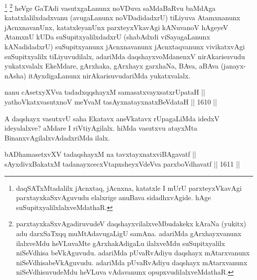 \begin{artha}
\footnote{daqSATxMtadalilx jAcnxtaq, jAcnxna, katatxle I mUrU parxteyxVkavAgi parxtayxkaSxvAguvudu elalxrige anuBava sidadhxvAgide. hAge suSupitxyalilxlalxveMdathaR.}
\footnote{parxtayxkaSxvAgadiruvudeV daqshayxvilalxveMbudakekx kAraNa (yukitx) adu darxSaTxqq muMtAdavugaLigU samAna. adariMda gArxhayxvanunx ilalxveMdu heVLuvaMte gArxhakAdigaLu ilalxveMdu suSupitxyalilx niSeVdhisa beVkAguvudu. adariMda pUvaRvAdiyu daqshayx mAtarxvanunx niSeVdhisabeVkAguvudu. adariMda pUvaRvAdiyu daqshayx mAtarxvanunx niSeVdhisuvudeMdu heVLuva vAdavanunx opupxvudilalxveMdathaR.}
heVge GaTAdi vasutxgaLanunx noVDuva saMdaBaRvu baMdAga katatxlalilxdadxvanu (avugaLanunx noVDadidadxrU) tiLiyuva Atamxnanunx jAcnxnavanUnx, katatxleyanUnx parxteyxVkavAgi kANuvanoV hAgeyeV AtamxnU kUDa suSupitxyalilxdadxrU (shabAdxdi viSayagaLanunx kANadidadxrU) suSupitxyanunx jAcnxnavanunx jAcnxtaqvanunx vivikatxvAgi suSupitxyalilx tiLiyuvudilalx, adariMda daqshayxvoMdanenxV nirAkarisuvudu yukatxvalalx EkeMdare, gArxhaka, gArxhayx garxhaNa, BAva, aBAva (janayx-nAsha) itAyxdigaLanunx nirAkarisuvudariMda yukatxvalalx.
\end{artha}


\begin{shl}
nanu cAsetxyXVva tadadxqqshayxM samasatxvayxsatxrUpataH || \\
yathoVkatxvasutxnoV meYvaM tasAyxnatayxnatxBeVdataH \hfill || 1610 ||  
\end{shl}

\begin{artha}
A daqshayx vasutxvU saha Ekatavx aneVkatavx rUpagaLiMda idedxV ideyalalxve? aMdare I  riVtiyAgilalx. hiMda vasutxvu atayxMta BinanxvAgilalxvAdadxriMda ilalx.
\end{artha}


\begin{shl}
bADhamasetxvXV tadaqshayxM na tavxtayxnatxviBAgavatf || \\
sAyxdivxBakatxM tadanayxcecxVtapxsheyxVdeVva parxboVdhavatf \hfill || 1611 ||  
\end{shl}

